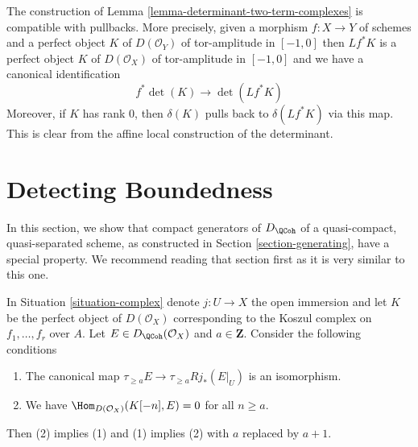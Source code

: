 \begin{remark}
\label{remark-functorial-det}
The construction of Lemma \ref{lemma-determinant-two-term-complexes}
is compatible with pullbacks. More precisely, given a morphism
$f : X \to Y$ of schemes and a perfect object $K$ of $D(\mathcal{O}_Y)$
of tor-amplitude in $[-1, 0]$ then $Lf^*K$ is a
perfect object $K$ of $D(\mathcal{O}_X)$
of tor-amplitude in $[-1, 0]$ and we have a canonical identification
$$
f^*\det(K) \longrightarrow \det(Lf^*K)
$$
Moreover, if $K$ has rank $0$, then $\delta(K)$ pulls back to
$\delta(Lf^*K)$ via this map. This is clear from the affine local
construction of the determinant.
\end{remark}






\section{Detecting Boundedness}
\label{section-detecting-boundedness}

\noindent
In this section, we show that compact generators of $D_\QCoh$ of a
quasi-compact, quasi-separated scheme, as constructed in
Section \ref{section-generating}, have a special property.
We recommend reading that section first as it is very similar to this one.

\begin{lemma}
\label{lemma-orthogonal-koszul-first-variant}
In Situation \ref{situation-complex} denote $j : U \to X$ the open
immersion and let $K$ be the perfect object of $D(\mathcal{O}_X)$
corresponding to the Koszul complex on $f_1, \ldots, f_r$ over $A$.
Let $E \in D_\QCoh(\mathcal{O}_X)$ and $a \in \mathbf{Z}$.
Consider the following conditions
\begin{enumerate}
\item The canonical map $\tau_{\geq a}E \to \tau_{\geq a} Rj_*(E|_U)$
is an isomorphism.
\item We have $\Hom_{D(\mathcal{O}_X)}(K[-n], E) = 0$ for all $n \geq a$.
\end{enumerate}
Then (2) implies (1) and (1) implies (2) with $a$ replaced by $a + 1$.
\end{lemma}

